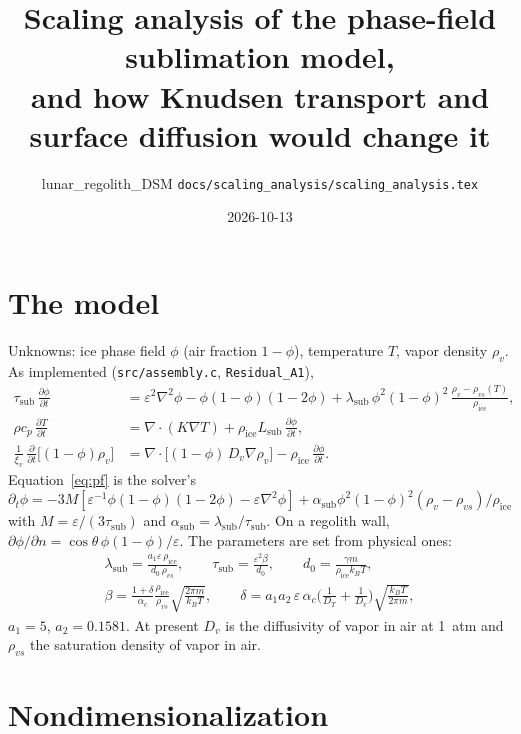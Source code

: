 \documentclass[11pt]{article}
\title{\vspace{-2.5em}Scaling analysis of the phase-field sublimation model,\\ and how Knudsen transport and surface diffusion would change it\vspace{-0.6em}}
\author{\small lunar\_regolith\_DSM \quad \texttt{docs/scaling\_analysis/scaling\_analysis.tex}}
\date{\vspace{-1em}\small 2026-10-13}
\newcommand{\ice}{\mathrm{ice}}
\newcommand{\rvs}{\rho_{vs}}
\newcommand{\pd}[2]{\frac{\partial #1}{\partial #2}}
\begin{document}
\maketitle

\section{The model}

Unknowns: ice phase field $\phi$ (air fraction $1-\phi$), temperature $T$,
vapor density $\rho_v$. As implemented (\texttt{src/assembly.c},
\texttt{Residual\_A1}),
\begin{align}
\tau_{\mathrm{sub}}\,\pd{\phi}{t} &= \varepsilon^{2}\nabla^{2}\phi - \phi(1-\phi)(1-2\phi)
   + \lambda_{\mathrm{sub}}\,\phi^{2}(1-\phi)^{2}\,\frac{\rho_v - \rvs(T)}{\rho_\ice} , \label{eq:pf}\\
\rho c_p\,\pd{T}{t} &= \nabla\cdot(K\nabla T) + \rho_\ice L_{\mathrm{sub}}\,\pd{\phi}{t} , \label{eq:heat}\\
\frac{1}{\xi_v}\,\pd{}{t}\big[(1-\phi)\rho_v\big] &= \nabla\cdot\big[(1-\phi)\,D_v\nabla\rho_v\big] - \rho_\ice\,\pd{\phi}{t} . \label{eq:vap}
\end{align}
Equation~\eqref{eq:pf} is the solver's $\partial_t\phi = -3M[\varepsilon^{-1}
\phi(1-\phi)(1-2\phi) - \varepsilon\nabla^{2}\phi] + \alpha_{\mathrm{sub}}
\phi^{2}(1-\phi)^{2}(\rho_v-\rvs)/\rho_\ice$ with $M =
\varepsilon/(3\tau_{\mathrm{sub}})$ and $\alpha_{\mathrm{sub}} =
\lambda_{\mathrm{sub}}/\tau_{\mathrm{sub}}$. On a regolith wall, $\partial\phi/\partial n =
\cos\theta\,\phi(1-\phi)/\varepsilon$. The parameters are set from physical
ones:
\begin{equation}
\begin{gathered}
\lambda_{\mathrm{sub}} = \frac{a_1\varepsilon\,\rho_\ice}{d_0\,\rvs},\qquad
\tau_{\mathrm{sub}} = \frac{\varepsilon^{2}\beta}{d_0},\qquad
d_0 = \frac{\gamma m}{\rho_\ice k_B T},\\
\beta = \frac{1+\delta}{\alpha_c}\frac{\rho_\ice}{\rvs}\sqrt{\frac{2\pi m}{k_B T}},\qquad
\delta = a_1a_2\,\varepsilon\,\alpha_c\Big(\frac{1}{D_T}+\frac{1}{D_v}\Big)\sqrt{\frac{k_BT}{2\pi m}} ,
\end{gathered}
\label{eq:params}
\end{equation}
$a_1 = 5$, $a_2 = 0.1581$. At present $D_v$ is the diffusivity of vapor in
air at 1~atm and $\rvs$ the saturation density of vapor in air.

\section{Nondimensionalization}
\end{document}
